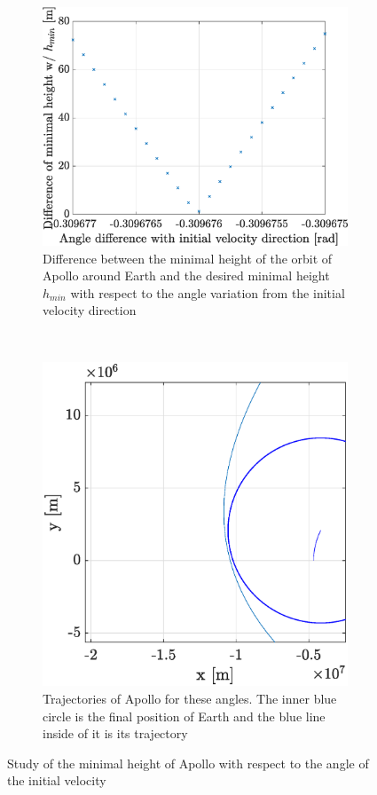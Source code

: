 \documentclass[a4paper,12pt,twoside]{article}
\begin{document}
\begin{figure}[h]
  \centering
  \begin{subfigure}[t]{0.47\textwidth}
    \includegraphics[width=\textwidth]{graphs/ex5a_hmin.eps}
    \caption{Difference between the minimal height of the orbit of Apollo around Earth and the desired minimal height $h_{min}$ with respect to the angle variation from the initial velocity direction}
    \label{fig:5a_hmin}
  \end{subfigure}
  ~
  \begin{subfigure}[t]{0.5\textwidth}
    \includegraphics[width=\textwidth]{graphs/ex5a_trajzoom.eps}
    \caption{Trajectories of Apollo for these angles. The inner blue circle is the final position of Earth and the blue line inside of it is its trajectory}
    \label{fig:5a_traj}
  \end{subfigure}
  \caption{Study of the minimal height of Apollo with respect to the angle of the initial velocity}
  \label{fig:5a}
\end{figure}
\end{document}
